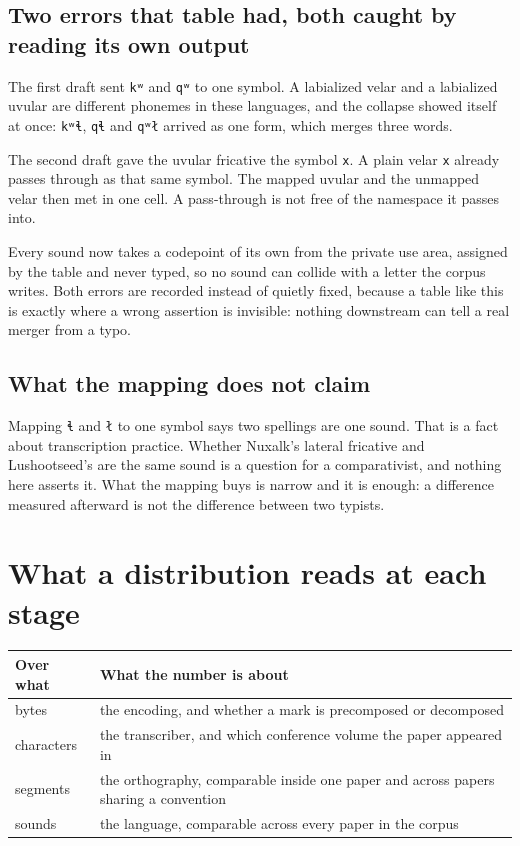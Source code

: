 \subsection{Two errors that table had, both caught by reading its own output}

The first draft sent \texttt{kʷ} and \texttt{qʷ} to one symbol. A labialized velar and a labialized
uvular are different phonemes in these languages, and the collapse showed itself at once:
\texttt{kʷɬ}, \texttt{qɬ} and \texttt{qʷł} arrived as one form, which merges three words.

The second draft gave the uvular fricative the symbol \texttt{x}. A plain velar \texttt{x} already
passes through as that same symbol. The mapped uvular and the unmapped velar then met in one cell.
A pass-through is not free of the namespace it passes into.

Every sound now takes a codepoint of its own from the private use area, assigned by the table and
never typed, so no sound can collide with a letter the corpus writes. Both errors are recorded
instead of quietly fixed, because a table like this is exactly where a wrong assertion is invisible:
nothing downstream can tell a real merger from a typo.

\subsection{What the mapping does not claim}

Mapping \texttt{ɬ} and \texttt{ł} to one symbol says two spellings are one sound. That is a fact
about transcription practice. Whether Nuxalk's lateral fricative and Lushootseed's are the same
sound is a question for a comparativist, and nothing here asserts it. What the mapping buys is
narrow and it is enough: a difference measured afterward is not the difference between two typists.

\section{What a distribution reads at each stage}

\tiny
\setlength{\tabcolsep}{2pt}
\begin{longtable}{@{}>{\arraybackslash}p{}>{\arraybackslash}p{}@{}}
\toprule
Over what & What the number is about \\
\midrule
bytes & the encoding, and whether a mark is precomposed or decomposed \\
characters & the transcriber, and which conference volume the paper appeared in \\
segments & the orthography, comparable inside one paper and across papers sharing a convention \\
sounds & the language, comparable across every paper in the corpus \\
\bottomrule
\end{longtable}
\normalsize

